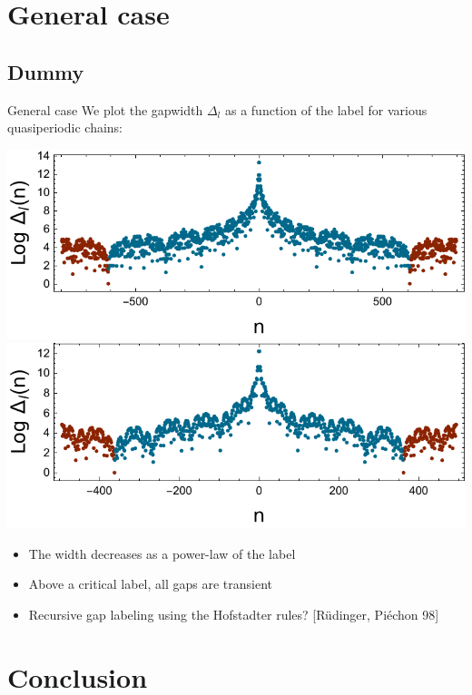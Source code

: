 \documentclass[xcolor=x11names,compress,professionalfonts]{beamer}
\renewcommand{\(}{\begin{columns}}
\renewcommand{\)}{\end{columns}}
\newcommand{\<}[1]{\begin{column}{#1}}
\renewcommand{\>}{\end{column}}
\begin{document}
\section{General case}
\subsection{Dummy}
\begin{frame}{General case}
We plot the gapwidth $\Delta_l$ as a function of the label for various quasiperiodic chains:

{\centering
\newcommand{\s}{.45}
\includegraphics[scale=\s]{img/loggapwidth_fibonacci_l_17.pdf}\\
\includegraphics[scale=\s]{img/loggapwidth_sqrt3_l_12.pdf}

}
\begin{itemize}
	\item The width decreases as a power-law of the label
	\item Above a critical label, all gaps are transient
	\item Recursive gap labeling using the Hofstadter rules?  \small{[Rüdinger, Piéchon 98]}
\end{itemize}

	
\end{frame}

\section{Conclusion}
\end{document}
